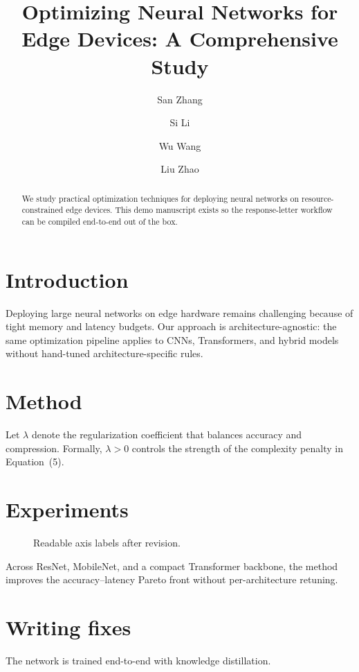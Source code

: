 \documentclass[manuscript,nonacm]{acmart}
\title{Optimizing Neural Networks for Edge Devices: A Comprehensive Study}
\author{San Zhang}
\author{Si Li}
\affiliation{%
  \institution{University of Technology}
  \city{Example City}
  \country{China}%
}
\author{Wu Wang}
\author{Liu Zhao}
\affiliation{%
  \institution{Innovation Corp}
  \city{Example City}
  \country{China}%
}
\begin{document}
\begin{abstract}
We study practical optimization techniques for deploying neural networks on
resource-constrained edge devices. This demo manuscript exists so the
response-letter workflow can be compiled end-to-end out of the box.
\end{abstract}
\maketitle

\section{Introduction}
Deploying large neural networks on edge hardware remains challenging because of
tight memory and latency budgets.
\rpoint[E3]Our approach is architecture-agnostic: the same optimization pipeline
applies to CNNs, Transformers, and hybrid models without hand-tuned
architecture-specific rules.

\section{Method}
Let $\lambda$ denote the regularization coefficient that balances accuracy and
compression.
\rpoint[E1]\rpoint[E2]Formally, $\lambda > 0$ controls the strength of the complexity penalty
in Equation~(5).

\section{Experiments}
\begin{figure}[h]
\centering
{}
\caption{Readable axis labels after revision.}
\end{figure}

\rpoint[E5]Across ResNet, MobileNet, and a compact Transformer backbone, the method
improves the accuracy--latency Pareto front without per-architecture retuning.

\section{Writing fixes}
\rpoint[E6]The network is trained end-to-end with knowledge distillation.
\end{document}
